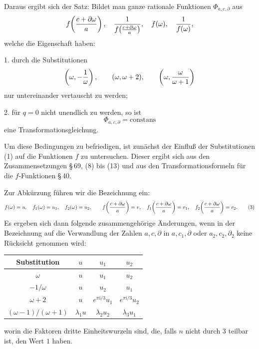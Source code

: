 \documentclass[11pt]{article}
\providecommand{\ii}{\mathrm{i}}
\begin{document}
Daraus ergibt sich der Satz: Bildet man ganze rationale Funktionen $\Phi_{a,c,\partial}$ aus
\[
 f\!\left({c+\partial\omega\over a}\right),\quad
 {1\over f\!\left({c+\partial\omega\over a}\right)},
 \quad f(\omega),\quad {1\over f(\omega)},
\]
welche die Eigenschaft haben:

1. durch die Substitutionen
\[
 \left(\omega,-{1\over\omega}\right),
 \qquad (\omega,\omega+2),
 \qquad \left(\omega,{\omega\over\omega+1}\right)
\]
nur untereinander vertauscht zu werden;

2. für $q=0$ nicht unendlich zu werden, so ist
\[
 \Phi_{a,c,\partial}=\text{constans}
\]
eine Transformationsgleichung.

Um diese Bedingungen zu befriedigen, ist zunächst der Einfluß der Substitutionen (1) auf die Funktionen $f$ zu untersuchen. Dieser ergibt sich aus den Zusammensetzungen \S\,69, (8) bis (13) und aus den Transformationsformeln für die $f$-Funktionen \S\,40.

Zur Abkürzung führen wir die Bezeichnung ein:
\begin{equation}
 f(\omega)=u,
 \quad f_1(\omega)=u_1,
 \quad f_2(\omega)=u_2,
 \qquad
 f\!\left({c+\partial\omega\over a}\right)=v,
 \quad f_1\!\left({c+\partial\omega\over a}\right)=v_1,
 \quad f_2\!\left({c+\partial\omega\over a}\right)=v_2.
\tag{3}
\end{equation}
Es ergeben sich dann folgende zusammengehörige Änderungen, wenn in der Bezeichnung auf die Verwandlung der Zahlen $a,c,\partial$ in $a,c_1,\partial$ oder $a_2,c_2,\partial_2$ keine Rücksicht genommen wird:
\begin{center}
\begin{tabular}{c|ccc}
Substitution & $u$ & $u_1$ & $u_2$ \\
\hline
$\omega$ & $u$ & $u_1$ & $u_2$\\
$-1/\omega$ & $u$ & $u_2$ & $u_1$\\
$\omega+2$ & $u$ & $e^{\pi\ii/3}u_1$ & $e^{\pi\ii/3}u_2$\\
$(\omega-1)/(\omega+1)$ & $\lambda_1u$ & $\lambda_2u_2$ & $\lambda_3u_1$
\end{tabular}
\end{center}
worin die Faktoren dritte Einheitswurzeln sind, die, falls $n$ nicht durch $3$ teilbar ist, den Wert $1$ haben.
\end{document}
